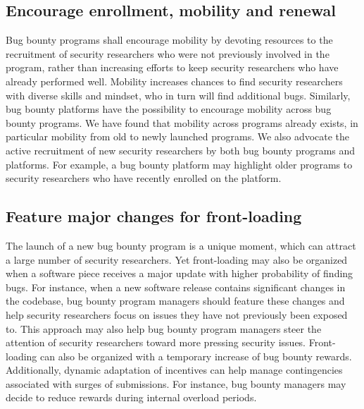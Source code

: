 \subsection{Encourage enrollment, mobility and renewal}
Bug bounty programs shall encourage mobility by devoting resources to the recruitment of security researchers who were not previously involved in the program, rather than increasing efforts to keep security researchers who have already performed well. Mobility increases chances to find security researchers with diverse skills and mindset, who in turn will find additional bugs. Similarly, bug bounty platforms have the possibility to encourage mobility across bug bounty programs. We have found that mobility across programs already exists, in particular mobility from old to newly launched programs. We also advocate the active recruitment of new security researchers by both bug bounty programs and platforms. For example, a bug bounty platform may highlight older programs to security researchers who have recently enrolled on the platform.

\subsection{Feature major changes for front-loading}
The launch of a new bug bounty program is a unique moment, which can attract a large number of security researchers. Yet front-loading may also be organized when a software piece receives a major update with higher probability of finding bugs. For instance, when a new software release contains significant changes in the codebase, bug bounty program managers should feature these changes and help security researchers focus on issues they have not previously been exposed to. This approach may also help bug bounty program managers steer the attention of security researchers toward more pressing security issues. Front-loading can also be organized with a temporary increase of bug bounty rewards. Additionally, dynamic adaptation of incentives can help manage contingencies associated with surges of submissions. For instance, bug bounty managers may decide to reduce rewards during internal overload periods. 
 
